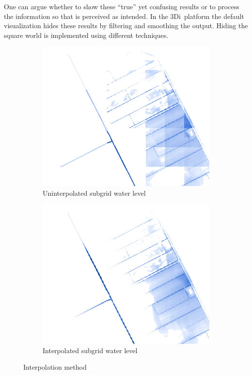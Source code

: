 \documentclass[a4paper]{article}
\DeclareRobustCommand{\threedi}{3Di~}
\begin{document}
One can argue whether to show these ``true'' yet confusing results or to process the information so that is perceived as intended. In the \threedi platform the default visualization hides these results by filtering and smoothing the output. Hiding the square world is implemented using different techniques.

\begin{figure}[htpb]
  \centering
  \begin{subfigure}{0.48\textwidth}
    \includegraphics[width=1\textwidth]{arta}
    \caption{Uninterpolated subgrid water level}

    \label{fig:arta}
  \end{subfigure}
  \begin{subfigure}{0.48\textwidth}
    \includegraphics[width=1\textwidth]{artb}
    \caption{Interpolated subgrid water level}
    \label{fig:artb}
  \end{subfigure}

  \label{fig:artifacts}

  \caption{Interpolation method}

\end{figure}
\end{document}
